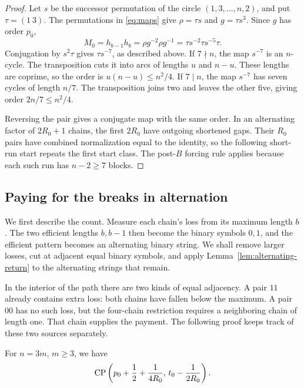 \begin{proof}
Let $s$ be the successor permutation of the circle $(1,3,\ldots,n,2)$,
and put $\tau=(1\ 3)$. The permutations in \eqref{eq:maps} give
$\rho=\tau s$ and $g=\tau s^3$. Since $g$ has order $p_0$,
\[
 M_0=h_{b-1}h_b=\rho g^{-2}\rho g^{-1}
     =\tau s^{-2}\tau s^{-5}\tau.
\]
Conjugation by $s^2\tau$ gives $\tau s^{-7}$, as described above.
If $7\nmid n$, the map $s^{-7}$ is an $n$-cycle. The transposition
cuts it into arcs of lengths $u$ and $n-u$. These lengths are coprime,
so the order is $u(n-u)\le n^2/4$.
If $7\mid n$, the map $s^{-7}$ has seven cycles of length $n/7$.
The transposition joins two and leaves the other five, giving order
$2n/7\le n^2/4$.

Reversing the pair gives a conjugate map with the same order. In an
alternating factor of $2R_0+1$ chains, the first $2R_0$ have outgoing
shortened gaps. Their $R_0$ pairs have combined normalization equal
to the identity, so the following short-run start repeats the first
start class. The post-$B$ forcing rule applies because each such run
has $n-2\ge7$ blocks.
\end{proof}

\subsection{Paying for the breaks in alternation}

We first describe the count. Measure each chain's loss from its maximum
length $b$. The two efficient lengths $b,b-1$ then become the binary
symbols $0,1$, and the efficient pattern becomes an alternating binary
string. We shall remove larger losses, cut at adjacent equal binary
symbols, and apply Lemma~\ref{lem:alternating-return} to the alternating
strings that remain.

In the interior of the path there are two kinds of equal adjacency.
A pair $11$ already contains
extra loss: both chains have fallen below the maximum. A pair $00$ has
no such loss, but the four-chain restriction requires a neighboring
chain of length one. That chain supplies the payment. The following
proof keeps track of these two sources separately.

\begin{proposition}\label{prop:CP0}
For $n=3m$, $m\ge3$, we have
\[
 \operatorname{CP}\left(p_0+\frac12+\frac1{4R_0},\,
 t_0-\frac1{2R_0}\right).
\]
\end{proposition}

